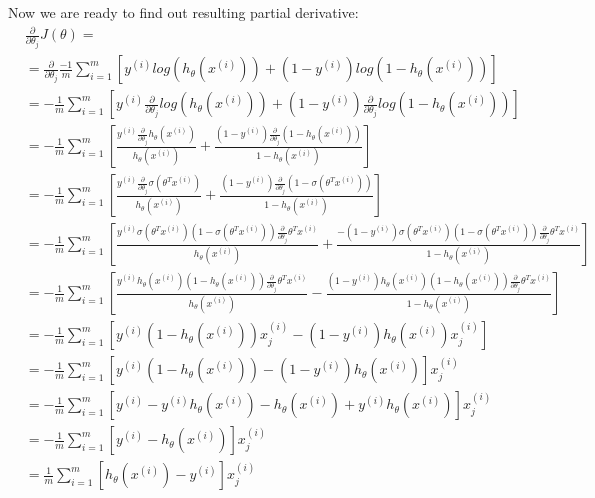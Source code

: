 Now we are ready to find out resulting partial derivative:
{\small
\begin{align*}
&\frac{\partial}{\partial \theta_j} J(\theta)= \\ 
&= \frac{\partial}{\partial \theta_j} \frac{-1}{m}\sum_{i=1}^m \left [ y^{(i)} log (h_\theta(x^{(i)})) + (1-y^{(i)}) log (1 - h_\theta(x^{(i)})) \right ] \\
&= - \frac{1}{m}\sum_{i=1}^m \left [     y^{(i)} \frac{\partial}{\partial \theta_j} log (h_\theta(x^{(i)}))   + (1-y^{(i)}) \frac{\partial}{\partial \theta_j} log (1 - h_\theta(x^{(i)}))\right ] \\
&= - \frac{1}{m}\sum_{i=1}^m \left [     \frac{y^{(i)} \frac{\partial}{\partial \theta_j} h_\theta(x^{(i)})}{h_\theta(x^{(i)})}   + \frac{(1-y^{(i)})\frac{\partial}{\partial \theta_j} (1 - h_\theta(x^{(i)}))}{1 - h_\theta(x^{(i)})}\right ] \\
&= - \frac{1}{m}\sum_{i=1}^m \left [     \frac{y^{(i)} \frac{\partial}{\partial \theta_j} \sigma(\theta^T x^{(i)})}{h_\theta(x^{(i)})}   + \frac{(1-y^{(i)})\frac{\partial}{\partial \theta_j} (1 - \sigma(\theta^T x^{(i)}))}{1 - h_\theta(x^{(i)})}\right ] \\
&= - \frac{1}{m}\sum_{i=1}^m \left [     \frac{y^{(i)} \sigma(\theta^T x^{(i)}) (1 - \sigma(\theta^T x^{(i)})) \frac{\partial}{\partial \theta_j} \theta^T x^{(i)}}{h_\theta(x^{(i)})}   + \frac{- (1-y^{(i)}) \sigma(\theta^T x^{(i)}) (1 - \sigma(\theta^T x^{(i)})) \frac{\partial}{\partial \theta_j} \theta^T x^{(i)}}{1 - h_\theta(x^{(i)})}\right ] \\
&= - \frac{1}{m}\sum_{i=1}^m \left [     \frac{y^{(i)} h_\theta(x^{(i)}) (1 - h_\theta(x^{(i)})) \frac{\partial}{\partial \theta_j} \theta^T x^{(i)}}{h_\theta(x^{(i)})}   - \frac{(1-y^{(i)}) h_\theta(x^{(i)}) (1 - h_\theta(x^{(i)})) \frac{\partial}{\partial \theta_j} \theta^T x^{(i)}}{1 - h_\theta(x^{(i)})}\right ] \\
&= - \frac{1}{m}\sum_{i=1}^m \left [     y^{(i)} (1 - h_\theta(x^{(i)})) x^{(i)}_j - (1-y^{(i)}) h_\theta(x^{(i)}) x^{(i)}_j\right ] \\
&= - \frac{1}{m}\sum_{i=1}^m \left [     y^{(i)} (1 - h_\theta(x^{(i)})) - (1-y^{(i)}) h_\theta(x^{(i)}) \right ] x^{(i)}_j \\
&= - \frac{1}{m}\sum_{i=1}^m \left [     y^{(i)} - y^{(i)} h_\theta(x^{(i)}) - h_\theta(x^{(i)}) + y^{(i)} h_\theta(x^{(i)}) \right ] x^{(i)}_j \\
&= - \frac{1}{m}\sum_{i=1}^m \left [ y^{(i)} - h_\theta(x^{(i)}) \right ] x^{(i)}_j  \\
&= \frac{1}{m}\sum_{i=1}^m \left [ h_\theta(x^{(i)}) - y^{(i)} \right ] x^{(i)}_j
\end{align*}
}

